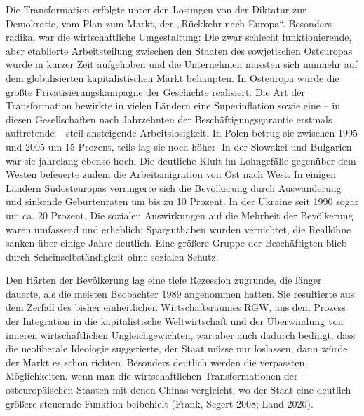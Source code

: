 \begin{multicols*}{2}
Die Transformation erfolgte unter den Losungen von der Diktatur zur Demokratie, vom Plan zum Markt, der „Rückkehr nach Europa“. Besonders radikal war die wirtschaftliche Umgestaltung: Die zwar schlecht funktionierende, aber etablierte Arbeitsteilung zwischen den Staaten des sowjetischen Osteuropas wurde in kurzer Zeit aufgehoben und die Unternehmen mussten sich nunmehr auf dem globalisierten kapitalistischen Markt behaupten. In Osteuropa wurde die größte Privatisierungskampagne der Geschichte realisiert. Die Art der Transformation bewirkte in vielen Ländern eine Superinflation sowie eine – in diesen Gesellschaften nach Jahrzehnten der Beschäftigungsgarantie erstmals auftretende – steil ansteigende Arbeitslosigkeit. In Polen betrug sie zwischen 1995 und 2005 um 15 Prozent, teils lag sie noch höher. In der Slowakei und Bulgarien war sie jahrelang ebenso hoch. Die deutliche Kluft im Lohngefälle gegenüber dem Westen befeuerte zudem die Arbeitsmigration von Ost nach West. In einigen Ländern Südosteuropas verringerte sich die Bevölkerung durch Auswanderung und sinkende Geburtenraten um bis zu 10 Prozent. In der Ukraine seit 1990 sogar um ca. 20 Prozent. Die sozialen Auswirkungen auf die Mehrheit der Bevölkerung waren umfassend und erheblich: Sparguthaben wurden vernichtet, die Reallöhne sanken über einige Jahre deutlich. Eine größere Gruppe der Beschäftigten blieb durch Scheinselbständigkeit ohne sozialen Schutz.  

Den Härten der Bevölkerung lag eine tiefe Rezession zugrunde, die länger dauerte, als die meisten Beobachter 1989 angenommen hatten. Sie resultierte aus dem Zerfall des bisher einheitlichen Wirtschaftsraumes RGW, aus dem Prozess der Integration in die kapitalistische Weltwirtschaft und der Überwindung von inneren wirtschaftlichen Ungleichgewichten, war aber auch dadurch bedingt, dass die neoliberale Ideologie suggerierte, der Staat müsse nur loslassen, dann würde der Markt es schon richten. Besonders deutlich werden die verpassten Möglichkeiten, wenn man die wirtschaftlichen Transformationen der osteuropäischen Staaten mit denen Chinas vergleicht, wo der Staat eine deutlich größere steuernde Funktion beibehielt (Frank, Segert 2008; Land 2020). 


\end{multicols*}
